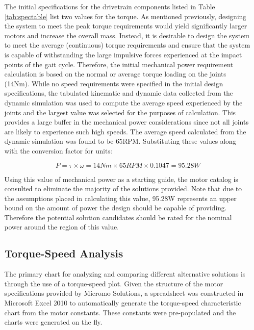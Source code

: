 The initial specifications for the drivetrain components listed in Table \ref{tab:spectable} list two values for the torque. As mentioned previously, designing the system to meet the peak torque requirements would yield significantly larger motors and increase the overall mass. Instead, it is desirable to design the system to meet the average (continuous) torque requirements and ensure that the system is capable of withstanding the large impulsive forces experienced at the impact points of the gait cycle. Therefore, the initial mechanical power requirement calculation is based on the normal or average torque loading on the joints (14Nm). While no speed requirements were specified in the initial design specifications, the tabulated kinematic and dynamic data collected from the dynamic simulation was used to compute the average speed experienced by the joints and the largest value was selected for the purposes of calculation. This provides a large buffer in the mechanical power considerations since not all joints are likely to experience such high speeds. The average speed calculated from the dynamic simulation was found to be 65RPM. Substituting these values along with the conversion factor for units: 

\begin{equation}
	P = \tau \times \omega = 14Nm \times 65RPM \times 0.1047 = 95.28W
\end{equation}

Using this value of mechanical power as a starting guide, the motor catalog is consulted to eliminate the majority of the solutions provided. Note that due to the assumptions placed in calculating this value, 95.28W represents an upper bound on the amount of power the design should be capable of providing. Therefore the potential solution candidates should be rated for the nominal power around the region of this value. 


\subsection{Torque-Speed Analysis} %
\label{sub:torque_speed_analysis}
The primary chart for analyzing and comparing different alternative solutions is through the use of a torque-speed plot. Given the structure of the motor specifications provided by Micromo Solutions, a spreadsheet was constructed in Microsoft Excel 2010 to automatically generate the torque-speed characteristic chart from the motor constants. These constants were pre-populated and the charts were generated on the fly. 

